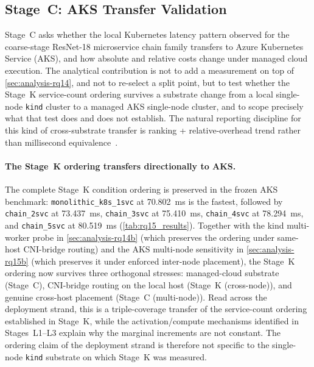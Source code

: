 \subsection{Stage~C: AKS Transfer Validation}
\label{sec:analysis-rq15}

Stage~C asks whether the local Kubernetes latency pattern observed for the
coarse-stage ResNet-18 microservice chain family transfers to Azure
Kubernetes Service (AKS), and how absolute and relative costs change
under managed cloud execution. The analytical contribution is not to add
a measurement on top of \cref{sec:analysis-rq14}, and not to re-select a
split point, but to test whether the Stage~K service-count ordering
survives a substrate change from a local single-node \texttt{kind}
cluster to a managed AKS single-node cluster, and to scope precisely
what that test does and does not establish. The natural reporting
discipline for this kind of cross-substrate transfer is ranking +
relative-overhead trend rather than millisecond
equivalence~\cite{benchmarking_sc15}.

\paragraph{The Stage~K ordering transfers directionally to AKS.}
The complete Stage~K condition ordering is preserved in the frozen AKS
benchmark: \texttt{monolithic\_k8s\_1svc} at 70.802~ms is the fastest,
followed by \texttt{chain\_2svc} at 73.437~ms, \texttt{chain\_3svc} at
75.410~ms, \texttt{chain\_4svc} at 78.294~ms, and \texttt{chain\_5svc}
at 80.519~ms (\cref{tab:rq15_results}). Together with the kind
multi-worker probe in \cref{sec:analysis-rq14b} (which preserves the ordering
under same-host CNI-bridge routing) and the AKS multi-node sensitivity
in \cref{sec:analysis-rq15b} (which preserves it under enforced
inter-node placement), the Stage~K ordering now survives three orthogonal
stresses: managed-cloud substrate (Stage~C), CNI-bridge routing on the
local host (Stage~K (cross-node)), and genuine cross-host placement (Stage~C (multi-node)). Read
across the deployment strand, this is a triple-coverage transfer of the
service-count ordering established in Stage~K, while the activation/compute
mechanisms identified in Stages~L1--L3 explain why the marginal increments
are not constant. The ordering claim of the deployment strand is therefore
not specific to the single-node \texttt{kind} substrate on which Stage~K was
measured.

